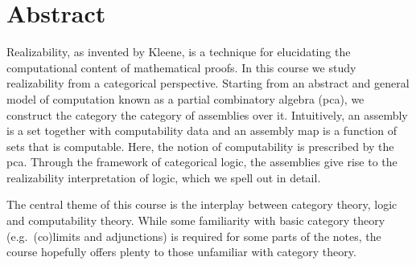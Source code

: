 \chapter{Abstract}

Realizability, as invented by Kleene, is a technique for elucidating the
computational content of mathematical proofs. In this course we study
realizability from a categorical perspective.
%
Starting from an abstract and general model of computation known as a partial
combinatory algebra (pca), we construct the category the category of assemblies
over it.
%
Intuitively, an assembly is a set together with computability data and an
assembly map is a function of sets that is computable. Here, the notion of
computability is prescribed by the pca.
%
Through the framework of categorical logic, the assemblies give rise to the
realizability interpretation of logic, which we spell out in detail.

The central theme of this course is the interplay between category theory, logic
and computability theory. While some familiarity with basic category theory
(e.g.\ (co)limits and adjunctions) is required for some parts of the notes, the
course hopefully offers plenty to those unfamiliar with category theory.


